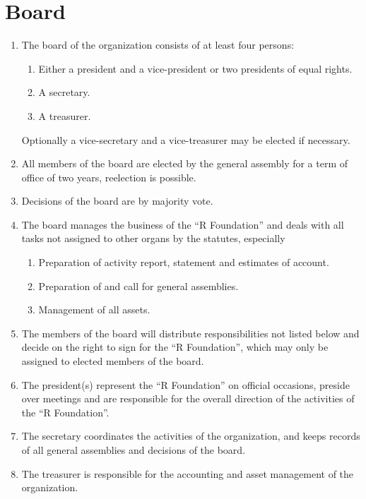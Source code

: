 \documentclass[a4paper]{article}
\newcommand{\RF}{``R Foundation''}
\begin{document}
\section{Board}

\begin{enumerate}
  \item
   The board of the organization consists of at least four
   persons:
   \begin{enumerate}
    \item Either a president and a vice-president or two presidents of
     equal rights.
    \item A secretary.
    \item A treasurer.
   \end{enumerate}
   Optionally a vice-secretary and a vice-treasurer may be elected if
   necessary.
   
  \item All members of the board are elected by the general assembly
   for a term of office of two years, reelection is possible.
   
  \item Decisions of the board are by majority vote.
   
  \item The board manages the business of the \RF{} and deals with all
   tasks not assigned to other organs by the statutes, especially
   \begin{enumerate}
    \item Preparation of activity report, statement and estimates of
     account.
    \item Preparation of and call for general assemblies.
    \item Management of all assets.
  \end{enumerate}
  
 \item The members of the board will distribute responsibilities not
  listed below and decide on the right to sign for the \RF{}, which may
  only be assigned to elected members of the board.
  
 \item The president(s) represent the \RF{} on official occasions,
  preside over meetings and are responsible for the overall direction
  of the activities of the \RF{}.
  
 \item The secretary coordinates the activities of the organization,
  and keeps records of all general assemblies and decisions of the
  board.
  
 \item The treasurer is responsible for the accounting and asset
  management of the organization.
\end{enumerate}
\end{document}
